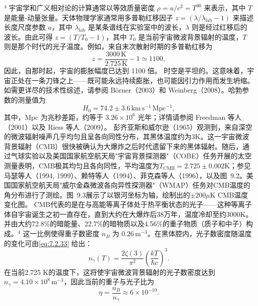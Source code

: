 ³ 宇宙学和广义相对论的计算通常以等效质量密度 \(\rho = u/c^{2} = T^{00}\) 来表示，其中 \(T\) 是能量-动量张量。天体物理学家通常用多普勒红移因子 \(z = (\lambda/\lambda_{\mathrm{lab}} - 1)\) 来描述长度尺度参数 \(a\)，其中 \(\lambda_{\mathrm{lab}}\) 是某条谱线在实验室中的波长，\(\lambda\) 则是经过红移后的波长。由此可得 \(z = (T/T_{0} - 1)\)，其中 \(T_{0}\) 是当前宇宙微波背景辐射的温度，\(T\) 则是那个时代的光子温度。例如，来自末次散射时期的多普勒红移为
\begin{equation}\tag{9.1.2}\label{eq:9.1.2}
z = \frac { 30 00 \, \mathrm { K } } { 2 . 72 5 \, \mathrm { K } } - 1 \simeq 11 00 ,
\end{equation}
因此，自那时起，宇宙的膨胀幅度已达到 1100 倍。
时空是平坦的。这意味着，宇宙正处在一条刀锋之上——既可能永远持续膨胀，也可能因引力作用而发生坍缩。如需更详尽的技术性综述，请参阅 Börner（2003）和 Weinberg（2008）。哈勃参数的测量值为
\begin{equation}\tag{9.1.3}\label{eq:9.1.3}
H _ { 0 } = 74 . 2 \pm 3 . 6 \, \mathrm { k m \, s ^{- 1} \, M p c ^{- 1} } ,
\end{equation}
其中，Mpc 为兆秒差距，约等于 \(3.26 \times 10^{6}\) 光年；详情请参阅 Freedman 等人（2001）以及 Riess 等人（2009）。
彭齐亚斯和威尔逊（1965）观测到，来自深空的微波辐射噪声几乎均匀且呈各向同性分布，其黑体温度约为3K。这一宇宙微波背景辐射（CMB）很快被确认为大爆炸之后时代遗留下来的黑体辐射。随后，通过气球实验以及美国国家航空航天局"宇宙背景探测器"（COBE）任务开展的太空测量表明，CMB极其均匀且各向同性，平均温度为\(T_{\mathrm{CMB}}=2.725 \pm 0.002 \mathrm{K}\)；参见马瑟等人（1994, 1999）、赖特等人（1994）、菲克森等人（1996），以及图~9.2。美国国家航空航天局"威尔金森微波各向异性探测器"（WMAP）任务对CMB温度的角分布进行了测绘。图~9.3展示了以银河坐标为轴，绘制出的\(\pm 200 \mu \mathrm{K}\) CMB温度变化图。
CMB代表的是在与高能等离子体处于热平衡状态的光子——这种等离子体自宇宙诞生之初一直存在，直到大约在大爆炸后38万年，温度冷却至约3000K。
并由大约72.8\%的暗能量、22.7\%的暗物质以及4.56\%的重子物质（质子和中子）构成。\(^{4}\) 这一比例使得重子数密度 \(n_{B}\) 为 \(0.26\,\mathrm{m}^{-3}\)。在黑体腔内，光子数密度随温度的变化可由\autoref{eq:7.2.33} 给出：
\begin{equation}\tag{9.1.4}\label{eq:9.1.4}
n _ { \gamma } ( T ) = \frac { 2 \zeta ( 3 ) } { \pi ^{2} } \left( \frac { k T } { \hbar c } \right) ^{3} .
\end{equation}
在当前2.725 K的温度下，这将使宇宙微波背景辐射的光子数密度达到 \(n_{\gamma} = 4.10 \times 10^{8}\,\mathrm{m}^{-3}\)，因此当前的重子与光子比为
\begin{equation}\tag{9.1.5}\label{eq:9.1.5}
\eta = \frac { n _ { B } } { n _ { \gamma } } \approx 6 \times 10 ^{- 10} .
\end{equation}

